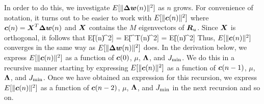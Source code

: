 In order to do this, we investigate $E[\|\boldsymbol{\Delta w}(n)\|^2]$ as $n$ grows. For convenience of notation, it turns out to be easier to work with $E[\|\boldsymbol{c}(n)\|^2]$ where $\boldsymbol{c}(n)= \boldsymbol{X}^T\boldsymbol{\Delta}\boldsymbol{w}(n)$ and $\boldsymbol{X}$ contains the $M$ eigenvectors of $\boldsymbol{R}_u$. Since $\boldsymbol{X}$ is orthogonal, it follows that
\bmath
  E[\|(n)\|^2] = E[\|^T(n)\|^2] = E[\|(n)\|^2]
\emath
Thus, $E[\|\boldsymbol{c}(n)\|^2]$ converges in the same way as $E[\|\boldsymbol{\Delta w}(n)\|^2]$ does. In the derivation below, we express $E[\|\boldsymbol{c}(n)\|^2]$ as a function of $\boldsymbol{c}(0)$, $\mu$, $\boldsymbol{\Lambda}$, and $J_\textup{min}$. We do this in a recursive manner starting by expressing $E[\|\boldsymbol{c}(n)\|^2]$ as a function of $\boldsymbol{c}(n-1)$, $\mu$, $\boldsymbol{\Lambda}$, and $J_\textup{min}$. Once we have obtained an expression for this recursion, we express $E[\|\boldsymbol{c}(n)\|^2]$ as a function of $\boldsymbol{c}(n-2)$, $\mu$, $\boldsymbol{\Lambda}$, and $J_\textup{min}$ in the next recursion and so on.

